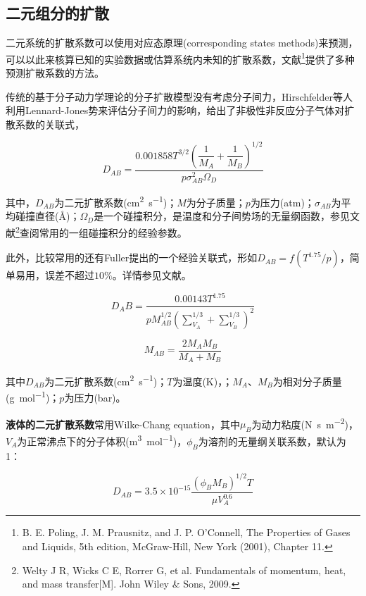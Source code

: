 \subsection{二元组分的扩散}

二元系统的扩散系数可以使用对应态原理(corresponding states methods)来预测，可以以此来核算已知的实验数据或估算系统内未知的扩散系数，文献\footnote{B. E. Poling, J. M. Prausnitz, and J. P. O’Connell, The Properties of Gases and Liquids, 5th edition, McGraw-Hill, New York (2001), Chapter 11.}提供了多种预测扩散系数的方法。

传统的基于分子动力学理论的分子扩散模型没有考虑分子间力，Hirschfelder等人利用Lennard-Jones势来评估分子间力的影响，给出了非极性非反应分子气体对扩散系数的关联式，

\begin{equation}
D_{AB} = \frac{0.001858T^{3/2}\left(\dfrac{1}{M_A}+\dfrac{1}{M_B}\right)^{1/2}}{p\sigma_{AB}^2 \Omega_D}
\end{equation}

其中，$ D_{AB} $为二元扩散系数(\si{cm\squared\per\second})；$ M $为分子质量；$ p $为压力(\si{atm})；$ \sigma_{AB} $为平均碰撞直径(\si{\angstrom})；$ \Omega_D $是一个碰撞积分，是温度和分子间势场的无量纲函数，参见文献\footnote{Welty J R, Wicks C E, Rorrer G, et al. Fundamentals of momentum, heat, and mass transfer[M]. John Wiley \& Sons, 2009.}查阅常用的一组碰撞积分的经验参数。

此外，比较常用的还有Fuller提出的一个经验关联式，形如$ D_{AB}=f(T^{1.75}/p) $，简单易用，误差不超过$ 10\% $。详情参见文献\cite{poling2001properties}。

\begin{equation}
D_AB=\frac{0.00143T^{1.75}}{pM_{AB}^{1/2}\left( \sum_{V_A}^{1/3} + \sum_{V_B}^{1/3} \right)^2 }
\end{equation}

\begin{equation}
M_{AB}=\frac{2M_A M_B}{M_A + M_B}
\end{equation}

其中$ D_{AB} $为二元扩散系数(\si{cm\squared\per\second})；$ T $为温度(\si{\kelvin})，；$ M_A $、$ M_B $为相对分子质量(\si{\g\per\mole})；$ p $为压力(\si{bar})。

\textbf{液体的二元扩散系数}常用Wilke-Chang equation，其中$ \mu_B $为动力粘度(\si{\newton\second\per\square\meter})，$ V_A $为正常沸点下的分子体积(\si{\cubic\meter\per\mole})，$ \phi_B $为溶剂的无量纲关联系数，默认为1：

\begin{equation}
D_{AB} = 3.5\times 10^{-15} \frac{(\phi_B M_B)^{1/2} T}{\mu V_A^{0.6}}
\end{equation}


